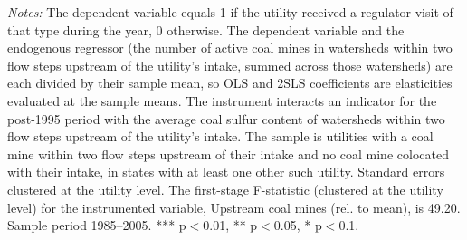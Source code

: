 \begin{table}[htbp]
\begin{minipage}{\linewidth}
\footnotesize
\raggedright
\textit{Notes:} The dependent variable equals 1 if the utility received a regulator visit of that type during the year, 0 otherwise. The dependent variable and the endogenous regressor (the number of active coal mines in watersheds within two flow steps upstream of the utility's intake, summed across those watersheds) are each divided by their sample mean, so OLS and 2SLS coefficients are elasticities evaluated at the sample means. The instrument interacts an indicator for the post-1995 period with the average coal sulfur content of watersheds within two flow steps upstream of the utility's intake. The sample is utilities with a coal mine within two flow steps upstream of their intake and no coal mine colocated with their intake, in states with at least one other such utility. Standard errors clustered at the utility level. The first-stage F-statistic (clustered at the utility level) for the instrumented variable, Upstream coal mines (rel. to mean), is 49.20. Sample period 1985--2005. *** p$<$0.01, ** p$<$0.05, * p$<$0.1.
\end{minipage}
\end{table}
